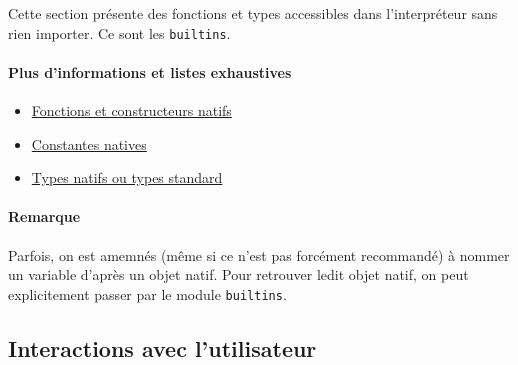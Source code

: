 \documentclass[a4paper, 10pt]{article}
\begin{document}
Cette  section présente des fonctions et types accessibles dans l'interpréteur sans rien importer. Ce sont les \texttt{builtins}.

\paragraph*{Plus d'informations et listes exhaustives}
\begin{itemize}
    \item \href{https://docs.python.org/fr/3/library/functions.html}{Fonctions et constructeurs natifs}
    \item \href{https://docs.python.org/fr/3/library/constants.html}{Constantes natives}
    \item \href{https://docs.python.org/fr/3/library/stdtypes.html}{Types natifs ou types standard}
\end{itemize}

\paragraph*{Remarque} Parfois, on est amemnés (même si ce n'est pas forcément recommandé) à nommer un variable d'après un objet natif. Pour retrouver ledit objet natif, on peut explicitement passer par le module \texttt{builtins}.

\subsection{Interactions avec l'utilisateur}
\end{document}
